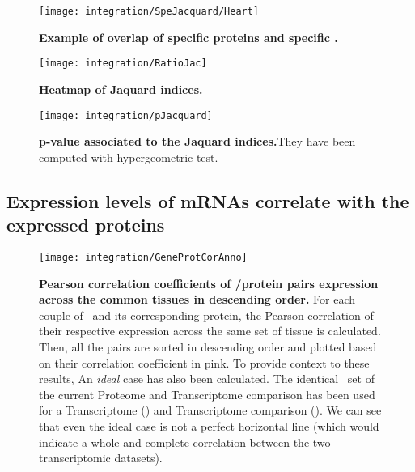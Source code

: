 \begin{figure}[!htbp]
\texttt{[image: integration/SpeJacquard/Heart]}\centering
    \caption[Example of overlap of specific protein and specific
    mRNAs for heart]{\label{fig:ExJacquard}\textbf{Example of overlap of
    specific proteins and specific \mRNAs.}}
\end{figure}


\begin{figure}[!htbp]
\texttt{[image: integration/RatioJac]}\centering
    \caption[Heatmap of Jaquard indices]{\label{fig:RatioJac}\textbf{Heatmap of
    Jaquard indices.}}
\end{figure}

\begin{figure}[!htbp]
\texttt{[image: integration/pJacquard]}\centering
    \caption[p-values associated to the Jaquard
    indices]{\label{fig:pJacquard}\textbf{p-value associated to the Jaquard
    indices.}They have been computed with hypergeometric test.}
\end{figure}

\subsection{Expression levels of mRNAs correlate with the expressed proteins}

\begin{figure}[!htbp]
    \texttt{[image: integration/GeneProtCorAnno]}\centering
    \caption[Pearson correlation coefficients of \mRNA/protein pairs expression
    across the common tissues in descending order]
    {\label{GeneProtCor}\textbf{Pearson correlation coefficients of \mRNA/protein
    pairs expression across the common tissues in descending order.} For each
    couple of \mRNA\ and its corresponding protein, the Pearson correlation of
    their respective expression across the same set of tissue is calculated. Then,
    all the pairs are sorted in descending order and plotted based on their
    correlation coefficient in pink. To provide context to these results,
    An \emph{ideal} case has also been calculated. The identical \mRNAs\ set of
    the current Proteome and Transcriptome comparison has been used for a
    Transcriptome () and Transcriptome comparison
    (). We can see that even the ideal case is not a perfect
    horizontal line (which would indicate a whole and complete correlation between
    the two transcriptomic datasets).}
\end{figure}


